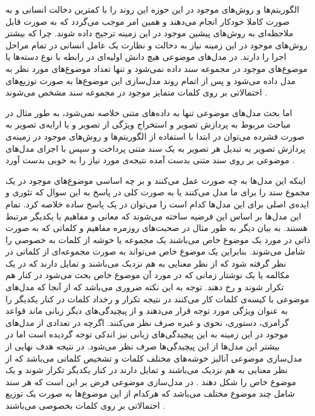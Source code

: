 الگوریتم‌ها و روش‌های موجود در این حوزه این روند را با کمترین دخالت انسانی‌ و به صورت کاملا خودکار انجام می‌‌دهند و همین امر موجب می‌‌گردد که به صورت قابل ملاحظه‌ای به روش‌های پیشین موجود در این زمینه ترجیح داده شوند. چرا که بیشتر روش‌های موجود در این زمینه نیاز به دخالت و نظارت یک عامل انسانی‌ در تمام مراحل اجرا را دارند. در مدل‌های موضوعی هیچ دانش اولیه‌ای در رابطه با نوع دسته‌ها یا موضوع‌های موجود در مجموعه سند داده نمی‌‌شود و تنها تعداد موضوع‌های مورد نظر به مدل داده می‌‌شود و پس از اتمام روند مدل‌سازی این موضوع‌ها به صورت توزیع‌های احتمالاتی بر روی کلمات متمایز موجود در مجموعه سند مشخص می‌‌شوند
\cite{mohr2013introduction}.

اما بحث مدل‌های موضوعی تنها به داده‌های متنی خلاصه نمی‌شود، به طور مثال در مباحث مربوط به پردازش تصویر
و استخراج ویژگی
از تصویر و یا ارایه‌ی تصویر به صورت فشرده می‌‌توان در ابتدا با استفاده از الگوریتم‌ها و روش‌های موجود در زمینه‌ی پردازش تصویر به تبدیل هر تصویر به یک سند متنی پرداخت و سپس با اجرای مدل‌های موضوعی بر روی سند متنی بدست آمده نتیجه‌ی مورد نیاز را به خوبی‌  بدست آورد
\cite{mohr2013introduction}.

اینکه این مدل‌ها به چه صورت عمل می‌‌کنند و بر چه اساسی‌ موضوع‌های موجود در یک مجموع سند را برای ما مدل می‌‌کنند یا به صورت کلی‌ در پاسخ به این سوال که تئوری و ایده‌ی اصلی‌ برای این مدل‌ها کدام است را می‌‌توان در یک پاسخ ساده خلاصه کرد. تمام این مدل‌ها بر اساس این فرضیه ساخته می‌‌شوند که معانی و مفاهیم با یکدیگر مرتبط هستند. به بیان دیگر به طور مثال در صحبت‌های روزمره مفاهیم و کلماتی که به صورت ذاتی در مورد یک موضوع خاص می‌‌باشند یک مجموعه یا خوشه از کلمات به خصوصی را شامل  می‌شوند. بنابراین یک موضوع خاص می‌‌تواند به صورت مجموعه‌ای از کلماتی‌ در نظر گرفته شود که از نظر معنایی به هم نزدیک می‌‌باشند و تمایل دارند که در یک مکالمه یا یک نوشتار زمانی‌ که در مورد آن موضوع خاص بحث می‌‌شود در کنار هم تکرار شوند و رخ دهند. توجه به این نکته ضروری می‌‌باشد که از آنجا که مدل‌های موضوعی با کیسه‌ی کلمات کار می‌‌کنند در نتیجه تکرار و رخداد کلمات در کنار یکدیگر را به عنوان ویژگی‌ مورد توجه قرار می‌‌دهند و از پیچیدگی‌های دیگر زبانی ماند قواعد گرامری، دستوری، نحوی و غیره صرف نظر می‌‌کنند. اگرچه در تعدادی از مدل‌های موجود در این زمینه به این پیچیدگی‌های زبانی نیز اندکی توجه گردیده است اما در بیشتر این مدل‌ها از این پیچیدگی‌‌ها صرف نظر می‌‌شود. در نتیجه هدف نهایی از مدل‌سازی موضوعی آنالیز خوشه‌های مختلف کلمات و تشخیص کلماتی‌ می‌‌باشد که از نظر معنایی به هم نزدیک می‌‌باشند و تمایل دارند در کنار یکدیگر تکرار شوند و یک موضوع خاص را شکل دهند
\cite{mohr2013introduction}.
در مدل‌سازی موضوعی فرض بر این است که هر سند شامل چند موضوع مختلف می‌‌باشد که هرکدام از این موضوع‌ها به صورت یک توزیع احتمالاتی بر روی کلمات بخصوصی می‌‌باشند
\cite{steyvers2007probabilistic}.

